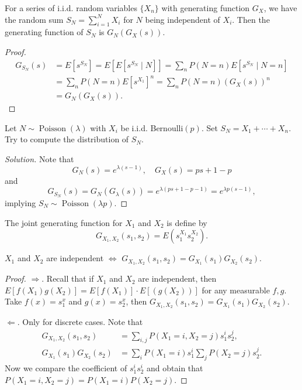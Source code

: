 \documentclass[11pt,singlecolumn, openany, citestyle=authoryear]{elegantbook}
\begin{document}
\begin{CJK}{UTF8}{gbsn}
\begin{theorem}
    For a series of i.i.d. random variables $\{X_n\}$ with generating
    function $G_X$, we have the random sum $S_N=\displaystyle \sum_{i=1}^N X_i$
    for $N$ being independent of $X_i$. Then the generating function of $S_N$ is 
    $G_N(G_X(s))$.     
\end{theorem}
\begin{proof}
    \begin{align*}
        G_{S_N}(s)&=E[s^{S_N}]=E[E[s^{S_N}\mid N]] =\sum_n P(N=n) E[s^{S_N}\mid N=n]\\
        &=\sum_n P(N=n) E[s^{X_1}]^n = \sum_n P(N=n) (G_X(s))^n\\
        &=G_N(G_X(s)).
    \end{align*}
\end{proof}
\begin{example}
    Let $N\sim\operatorname{Poisson}(\lambda)$ with $X_i$ be i.i.d. Bernoulli$(p)$.
    Set $S_N = X_1+\cdots+X_n$. Try to compute the distribution of $S_N$.
\end{example}
\begin{proof}[Solution]
    Note that 
    $$
    G_N(s)=e^{\lambda(s-1)},\quad G_X(s)=ps+1-p
    $$
    and 
    $$
    G_{S_N}(s)=G_N(G_\lambda (s))=e^{\lambda(ps+1-p-1)} = 
    e^{\lambda p(s-1)},
    $$
    implying $S_N \sim \operatorname{Poisson}(\lambda p)$.
\end{proof}
\begin{definition}
    The joint generating function for $X_1$ and $X_2$ is define by 
    $$
    G_{X_1,X_2}(s_1,s_2)=E(s_1^{X_1}s_2^{X_2}).
    $$ 
\end{definition}

\begin{theorem}
    $X_1$ and $X_2$ are independent $\iff$ $G_{X_1,X_2}(s_1,s_2)=G_{X_1}(s_1)G_{X_2}(s_2)$. 
\end{theorem}
\begin{proof}
    $\Longrightarrow$. Recall that if $X_1$ and $X_2$ are independent, then 
    $E[f(X_1)g(X_2)]=E[f(X_1)]\cdot E[(g(X_2))]$ for any measurable $f,g$.
    Take $f(x)=s_1^x$ and $g(x)=s_2^x$, then  
    $G_{X_1,X_2}(s_1,s_2)=G_{X_1}(s_1)G_{X_2}(s_2)$.

    $\Longleftarrow$. Only for discrete cases. Note that 
\begin{align*}
    G_{X_1,X_2}(s_1,s_2) &= \sum_{i,j} P(X_1=i,X_2=j)s_1^is_2^j, \\
    G_{X_1}(s_1)G_{X_2}(s_2) &= \sum_i P(X_1=i)s_1^i \sum_j P(X_2=j)s_2^j.
\end{align*}
Now we compare the coefficient of $s_1^is_2^i$ and obtain that 
$P(X_1=i,X_2=j)=P(X_1=i)P(X_2=j)$.
\end{proof}


\end{CJK}
\end{document}
